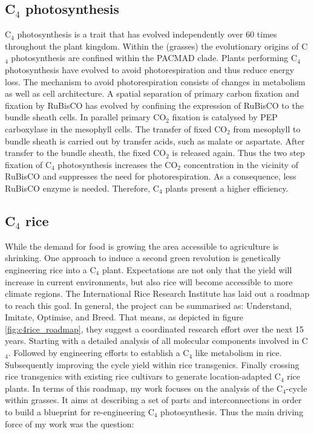 \subsection{C$_4$ photosynthesis}
C$_4$ photosynthesis is a trait that has evolved independently over 60 times throughout the plant kingdom.
Within the  (grasses) the evolutionary origins of C$_4$ photosynthesis are confined within the PACMAD clade.
Plants performing C$_4$ photosynthesis have evolved to avoid photorespiration and thus reduce energy loss.
The mechanism to avoid photorespiration consists of changes in metabolism as well as cell architecture.
A spatial separation of primary carbon fixation and fixation by RuBisCO has evolved by confining the expression of RuBisCO to the bundle sheath cells.
In parallel primary CO$_2$ fixation is catalysed by PEP carboxylase in the mesophyll cells.
The transfer of fixed CO$_2$ from mesophyll to bundle sheath is carried out by transfer acids, such as malate or aspartate.
After transfer to the bundle sheath, the fixed CO$_2$ is released again.
Thus the two step fixation of C$_4$ photosynthesis increases the CO$_2$ concentration in the vicinity of RuBisCO and suppresses the need for photorespiration.
As a consequence, less RuBisCO enzyme is needed.
Therefore, C$_4$ plants present a higher efficiency.
\subsection{C$_4$ rice}
While the demand for food is growing the area accessible to agriculture is shrinking.
One approach to induce a second green revolution is genetically engineering rice into a C$_4$ plant.
Expectations are not only that the yield will increase in current environments, but also rice will become accessible to more climate regions.
The International Rice Research Institute has laid out a roadmap to reach this goal.
In general, the project can be summarised as: Understand, Imitate, Optimise, and Breed.
That means, as depicted in figure \ref{fig:c4rice_roadmap}, they suggest a coordinated research effort over the next 15 years.
Starting with a detailed analysis of all molecular components involved in C$_4$.
Followed by engineering efforts to establish a C$_4$ like metabolism in rice.
Subsequently improving the cycle yield within rice transgenics.
Finally crossing rice transgenics with existing rice cultivars to generate location-adapted C$_4$ rice plants.
In terms of this roadmap, my work focuses on the analysis of the C$_4$-cycle within grasses.
It aims at describing a set of parts and interconnections in order to build a blueprint for re-engineering C$_4$ photosynthesis.
Thus the main driving force of my work was the question: 

